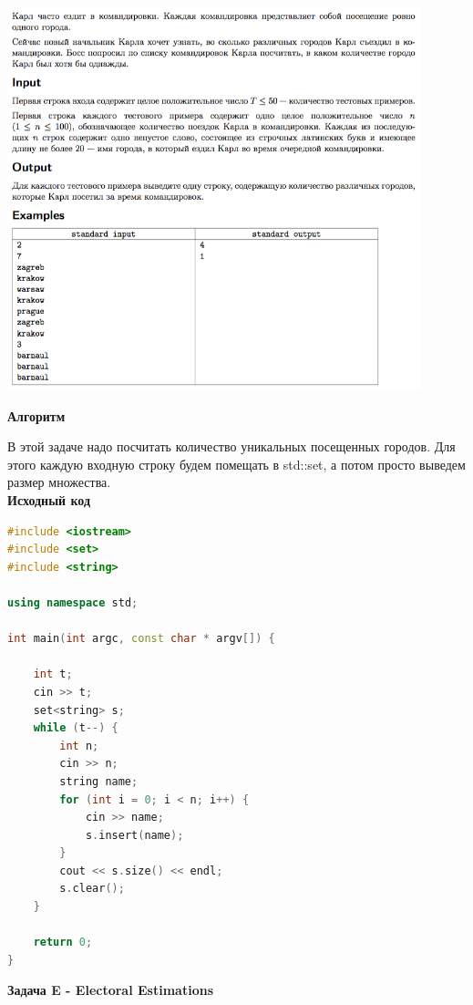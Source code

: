 \documentclass[a4paper,12pt]{article}
\begin{document}
\begin{center}
\includegraphics[width=0.9\textwidth]{OC_Europe/C.png}\\ [1cm]
\end{center}

\textbf{{\large Алгоритм}}

В этой задаче надо посчитать количество уникальных посещенных городов. Для этого каждую входную строку будем помещать в std::set, а потом просто выведем размер множества. \\

\newpage
\textbf{{\large Исходный код}} \\
\begin{lstlisting}[language=C++]
#include <iostream>
#include <set>
#include <string>

using namespace std;

int main(int argc, const char * argv[]) {
    
    int t;
    cin >> t;
    set<string> s;
    while (t--) {
        int n;
        cin >> n;
        string name;
        for (int i = 0; i < n; i++) {
            cin >> name;
            s.insert(name);
        }
        cout << s.size() << endl;
        s.clear();
    }
    
    return 0;
}

\end{lstlisting}


\newpage
\textbf{{\large Задача E - Electoral Estimations}}
\end{document}
